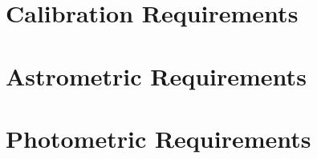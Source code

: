 
\section{Calibration Requirements}
\section{Astrometric Requirements}

\section{Photometric Requirements}